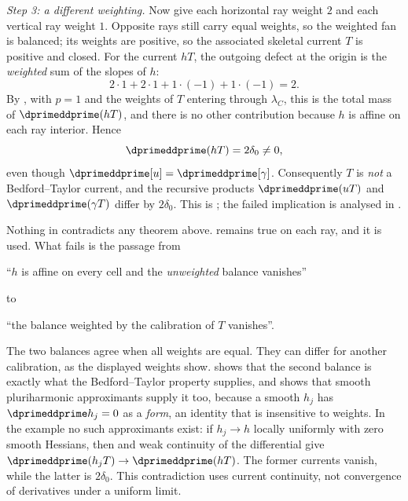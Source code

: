 \begin{example}
\emph{Step 3: a different weighting.}  Now give each horizontal ray weight
$2$ and each vertical ray weight $1$.  Opposite rays still carry equal
weights, so the weighted fan is balanced; its weights are positive, so the
associated skeletal current $T$ is positive and closed.  For the current
$hT$, the outgoing defect at the origin is the \emph{weighted} sum of the
slopes of $h$:
\begin{equation}
\label{eq:ch16-cross-weighted-sum}
 2\cdot1+2\cdot1+1\cdot(-1)+1\cdot(-1)=2 .
\end{equation}
By , with $p=1$ and the weights of $T$
entering through $\lambda_C$, this is the total mass of
$\dprimeddprime(hT)$, and there is no other contribution because $h$ is
affine on each ray interior.  Hence
\begin{equation}
\label{eq:ch16-cross-defect}
 \dprimeddprime(hT)=2\delta_0\neq0 ,
\end{equation}
even though $\dprimeddprime[u]=\dprimeddprime[\gamma]$.  Consequently $T$ is
\emph{not} a Bedford--Taylor current, and the recursive products
$\dprimeddprime(uT)$ and $\dprimeddprime(\gamma T)$ differ by $2\delta_0$.
This is ; the failed implication is analysed in
.
\end{example}

\begin{remark}
\label{rem:ch16-cross-reading}
Nothing in  contradicts any theorem above.
 remains true on each ray, and it is used.
What fails is the passage from
\begin{center}
``$h$ is affine on every cell and the \emph{unweighted} balance vanishes''
\end{center}
to
\begin{center}
``the balance weighted by the calibration of $T$ vanishes''.
\end{center}
The two balances agree when all weights are equal.  They can differ
for another calibration, as the displayed weights show.
 shows that the second balance is
exactly what the Bedford--Taylor property supplies, and
 shows that smooth pluriharmonic
approximants supply it too, because a smooth $h_j$ has
$\dprimeddprime h_j=0$ as a \emph{form}, an identity that is insensitive to
weights.  In the example no such approximants exist: if $h_j\to h$ locally
uniformly with zero smooth Hessians, then
 and weak continuity of the
differential give $\dprimeddprime(h_jT)\to\dprimeddprime(hT)$.  The former
currents vanish, while the latter is $2\delta_0$.  This contradiction uses
current continuity, not convergence of derivatives under a uniform limit.
\end{remark}

